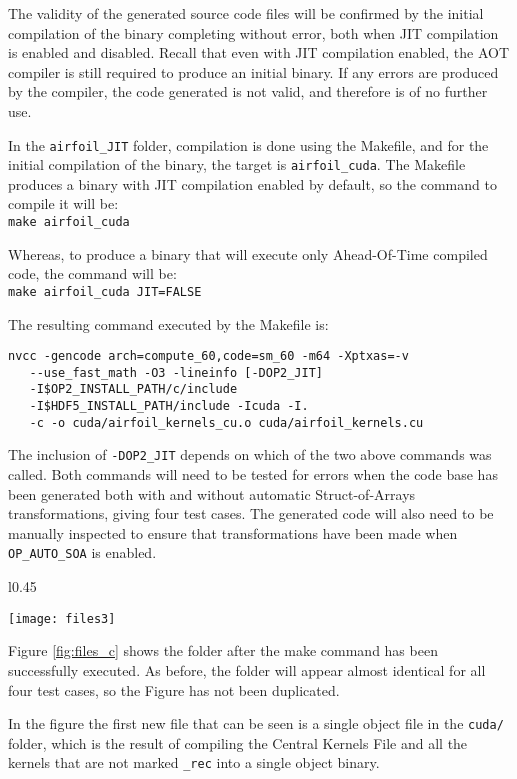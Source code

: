 The validity of the generated source code files will be confirmed by the initial compilation of the binary completing without error, both when JIT compilation is enabled and disabled. Recall that even with JIT compilation enabled, the AOT compiler is still required to produce an initial binary. If any errors are produced by the compiler, the code generated is not valid, and therefore is of no further use.
\par
In the \verb|airfoil_JIT| folder, compilation is done using the Makefile, and for the initial compilation of the binary, the target is \verb|airfoil_cuda|. The Makefile produces a binary with JIT compilation enabled by default, so the command to compile it will be: \\\verb|make airfoil_cuda|
\par Whereas, to produce a binary that will execute only Ahead-Of-Time compiled code, the command will be: \\\verb|make airfoil_cuda JIT=FALSE|
\par \noindent The resulting command executed by the Makefile is: \vspace{-1em}
\begin{verbatim}
nvcc -gencode arch=compute_60,code=sm_60 -m64 -Xptxas=-v
   --use_fast_math -O3 -lineinfo [-DOP2_JIT]
   -I$OP2_INSTALL_PATH/c/include
   -I$HDF5_INSTALL_PATH/include -Icuda -I.
   -c -o cuda/airfoil_kernels_cu.o cuda/airfoil_kernels.cu
\end{verbatim}
The inclusion of \verb|-DOP2_JIT| depends on which of the two above commands was called. Both commands will need to be tested for errors when the code base has been generated both with and without automatic Struct-of-Arrays transformations, giving four test cases. The generated code will also need to be manually inspected to ensure that transformations have been made when \verb|OP_AUTO_SOA| is enabled.
\begin{wrapfigure}[18]{l}{0.45\textwidth}
\caption{\textit{airfoil} folder after Ahead-Of-Time compilation}
\label{fig:files_c}
\texttt{[image: files3]}
\end{wrapfigure}
\par
\noindent Figure \ref{fig:files_c} shows the folder after the make command has been successfully executed. As before, the folder will appear almost identical for all four test cases, so the Figure has not been duplicated.\par
In the figure the first new file that can be seen is a single object file in the \verb|cuda/| folder, which is the result of compiling the Central Kernels File and all the kernels that are not marked \verb|_rec| into a single object binary.
